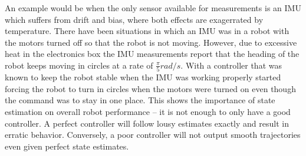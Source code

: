 An example would be when the only sensor available for measurements is an IMU which suffers from drift and bias, where both effects are exagerrated by temperature. There have been situations in which an IMU was in a robot with the motors turned off so that the robot is not moving. However, due to excessive heat in the electronics box the IMU measurements report that the heading of the robot keeps moving in circles at a rate of $\frac{\pi}{5} rad/s$. With a controller that was known to keep the robot stable when the IMU was working properly started forcing the robot to turn in circles when the motors were turned on even though the command was to stay in one place. This shows the importance of state estimation on overall robot performance -- it is not enough to only have a good controller. A perfect controller will follow lousy estimates exactly and result in erratic behavior. Conversely, a poor controller will not output smooth trajectories even given perfect state estimates.